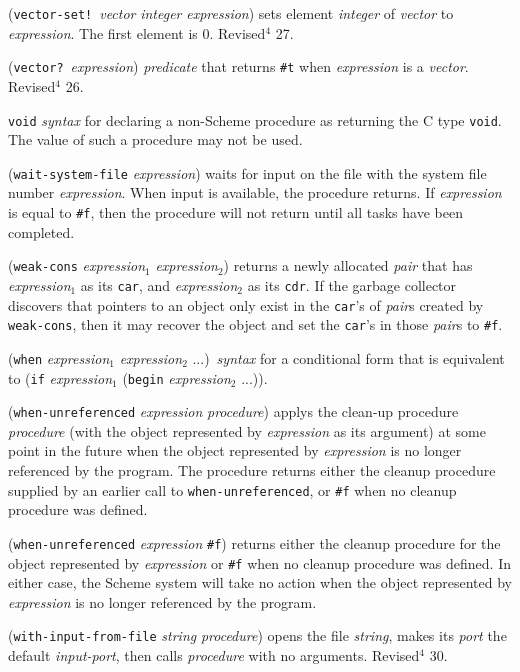 \documentclass[10pt,twocolumn]{article}
\begin{document}
(\texttt{vector-set!}\ \emph{vector} \emph{integer} \emph{expression}) sets element
\emph{integer} of \emph{vector} to \emph{expression}.  The first element is 0.
Revised$^4$ 27.

(\texttt{vector?}\ \emph{expression}) \emph{predicate} that returns \texttt{\#t} when
\emph{expression} is a \emph{vector}.  Revised$^4$ 26.

\texttt{void} \emph{syntax} for declaring a non-Scheme procedure as returning
the C type \texttt{void}.  The value of such a procedure may not be used.

(\texttt{wait-system-file} \emph{expression}) waits for input on the file
with the system file number \emph{expression}.  When input is available,
the procedure returns.  If \emph{expression} is equal to \texttt{\#f}, then
the procedure will not return until all tasks have been completed.

(\texttt{weak-cons} \emph{expression}$_1$ \emph{expression}$_2$) returns a
newly allocated \emph{pair} that has \emph{expression}$_1$ as its \texttt{car},
and \emph{expression}$_2$ as its \texttt{cdr}.  If the garbage collector
discovers that pointers to an object only exist in the \texttt{car}'s of
\emph{pair}s created by \texttt{weak-cons}, then it may recover the object
and set the \texttt{car}'s in those \emph{pair}s to \texttt{\#f}.

(\texttt{when} \emph{expression}$_1$ \emph{expression}$_2$ ...)\ \emph{syntax} for
a conditional form that is equivalent to (\texttt{if} \emph{expression}$_1$
(\texttt{begin} \emph{expression}$_2$ ...)).

(\texttt{when-unreferenced} \emph{expression} \emph{procedure}) applys
the clean-up procedure \emph{procedure} (with the object
represented by \emph{expression} as its argument) at some point in
the future when the object represented by \emph{expression} is no
longer referenced by the program.  The procedure returns
either the cleanup procedure supplied by an earlier call to
\texttt{when-unreferenced}, or \texttt{\#f} when no cleanup procedure was
defined.

(\texttt{when-unreferenced} \emph{expression} \texttt{\#f}) returns either the
cleanup procedure for the object represented by
\emph{expression} or \texttt{\#f} when no cleanup procedure was
defined.  In either case, the Scheme system will take no
action when the object represented by \emph{expression} is no
longer referenced by the program.

(\texttt{with-input-from-file} \emph{string} \emph{procedure}) opens the file
\emph{string}, makes its \emph{port} the default \emph{input-port}, then
calls \emph{procedure} with no arguments.  Revised$^4$ 30.
\end{document}
